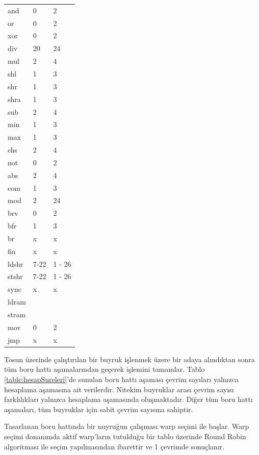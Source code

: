 \begin{longtable}{p{50pt} p{90pt} p{90pt}}
  and 		&	  0 &  2 \\
  or 		  &	  0 &  2 \\
  xor		  &	  0 &  2 \\
  div  		&  20 & 24 \\
  mul  		&   2 &  4 \\
  shl  		&   1 &  3 \\
  shr  		&   1 &  3 \\
  shra  	&   1 &  3 \\
  sub  		&   2 &  4 \\
  min  		&   1 &  3 \\
  max  		&   1 &  3 \\
  chs  		&   2 &  4 \\
  not  		&   0 &  2 \\
  abs  		&   2 &  4 \\
  com  		&   1 &  3 \\
  mod  		&   2 & 24 \\
  brv 		&	  0 &  2 \\
  bfr 		&	  1 &  3 \\
  br 			&	  x &  x \\
  fin 		&	  x &  x \\
  ldshr 	&	 7-22 & 1 - 26 \\
  stshr 	&	 7-22 & 1 - 26 \\
  sync		&	  x  & x \\
  ldram 	&	   &  \\
  stram		&	   &  \\
  mov 		&    0 & 2 \\
  jmp  		&    x & x \\
  
\end{longtable}

Tosun üzerinde çalıştırılan bir buyruk işlenmek üzere bir adaya alındıktan sonra tüm boru hattı aşamalarından geçerek işlemini tamamlar. Tablo \ref{table:hesapSureleri}'de sunulan boru hattı aşaması çevrim sayıları yalnızca hesaplama aşamasına ait verilerdir. Nitekim buyruklar arası çevrim sayısı farklılıkları yalnızca hesaplama aşamasında oluşmaktadır. Diğer tüm boru hattı aşamaları, tüm buyruklar için sabit çevrim sayısına sahiptir.\par

Tasarlanan boru hattında bir nuyruğun çalışması warp seçimi ile başlar. Warp seçimi donanımda aktif warp'ların tutulduğu bir tablo üzerinde Round Robin algoritması ile seçim yapılmasından ibarettir ve 1 çevrimde sonuçlanır. \par 

